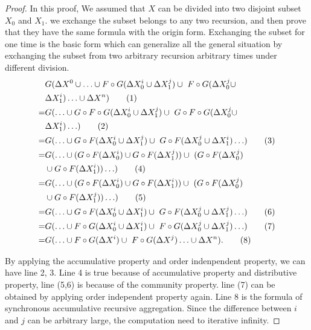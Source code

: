 \begin{proof}
	\label{sec:app:proof:correct}
	In this proof, We assumed that $X$ can be divided into two disjoint subset $X_0$ and $X_1$. we exchange the subset belongs to any two  recursion, and then prove that they have the same formula with the origin form. Exchanging the subset for one time is the basic form which can generalize all the general situation by exchanging the subset from two arbitrary recursion arbitrary times under different division.
	\begin{align}
	&G(\Delta X^0\cup \ldots \cup F\circ G(\Delta X^{i}_0 \cup \Delta X^{j}_1)\cup\ F\circ G(\Delta X^{j}_0 \cup \notag\\ &\Delta X^{i}_1) \ldots\cup \Delta X^n)\tag{1} \\
	=&G( \ldots \cup G \circ F\circ G(\Delta X^{i}_0 \cup \Delta X^{{j}}_1)\cup\ G \circ F\circ G(\Delta X^{{j}}_0 \cup \notag\\ &\Delta X^{i}_1) \ldots)\tag{2} \\
	=&G( \ldots \cup G \circ F(\Delta X^{i}_0 \cup \Delta X^{{j}}_1)\cup\ G \circ F(\Delta X^{{j}}_0 \cup \Delta X^{{i}}_1) \ldots)\tag{3} \\
	=&G( \ldots \cup (G\circ F(\Delta X^{i}_0) \cup G\circ F(\Delta X^{{j}}_1))\cup\ (G \circ F(\Delta X^{{j}}_0) \notag\\ &\cup G \circ F(\Delta X^{i}_1)) \ldots )\tag{4} \\
	=&G( \ldots \cup (G\circ F(\Delta X^{i}_0) \cup G\circ F(\Delta X^{i}_1))\cup\ (G \circ F(\Delta X^{{j}}_0) \notag\\ &\cup G  \circ F(\Delta X^{{j}}_1)) \ldots )\tag{5} \\
	=&G( \ldots \cup G \circ F(\Delta X^{i}_0 \cup \Delta X^{{i}}_1)\cup\ G \circ F(\Delta X^{{j}}_0 \cup \Delta X^{{j}}_1) \ldots)\tag{6} \\
	=&G( \ldots \cup F \circ G(\Delta X^{i}_0 \cup \Delta X^{{i}}_1)\cup\ F \circ G(\Delta X^{{j}}_0 \cup \Delta X^{{j}}_1) \ldots)\tag{7} \\
	=&G(\ldots \cup F \circ G(\Delta X^i)\cup\ F \circ G(\Delta X^{j}) \ldots\cup \Delta X^n).\tag{8}
	\end{align}
	
	By applying the accumulative property and order indenpendent property, we can have line 2, 3. Line 4 is true because of accumulative property
	and distributive property, line (5,6) is because of the community property. line (7) can be obtained by applying order independent property again.
	Line 8 is the formula of synchronous accumulative recursive aggregation. Since the difference between $i$ and $j$ can be arbitrary large, the computation need to iterative infinity.
	\end{proof}
